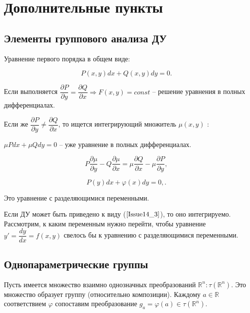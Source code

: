 
\section{Дополнительные пункты}

\subsection{Элементы группового анализа ДУ}

Уравнение первого порядка в общем виде:

\begin{equation}
	P(x,y)dx + Q(x,y)dy = 0.
	\label{Issue14_1}
\end{equation}

Если выполняется $\dfrac{\partial P}{\partial y} = \dfrac{\partial Q}{\partial x} \Rightarrow F(x,y) = const$ -- решение уравнения в полных дифференциалах.

Если же $\dfrac{\partial P}{\partial y} \neq \dfrac{\partial Q}{\partial x}$, то ищется интегрирующий множитель $\mu(x,y)$ :

$\mu Pdx + \mu Qdy = 0$ -- уже уравнение в полных дифференциалах.

\begin{equation}
	P\frac{\partial \mu}{\partial y} - Q \frac{\partial \mu}{\partial x} = \mu \dfrac{\partial Q}{\partial x} - \mu \dfrac{\partial P}{\partial y},
	\label{Issue14_2}
\end{equation}

\begin{equation}
	P(y)dx + \varphi(x)dy = 0,
	\label{Issue14_3}.
\end{equation}

Это уравнение с разделяющимися переменными.

Если ДУ может быть приведено к виду ($\ref{Issue14_3}$), то оно интегрируемо. Рассмотрим, к каким переменным нужно перейти, чтобы уравнение $y' = \dfrac{dy}{dx} = f(x,y)$ свелось бы к уравнению с разделяющимися переменными.

\subsection{Однопараметрические группы}

Пусть имеется множество взаимно однозначных преобразований $\mathbb{R}^n: \tau(\mathbb{R}^n)$.
Это множество образует группу (относительно композиции). Каждому $a \in \mathbb{R}$ соответствием $\varphi$ сопоставим преобразование $g_a = \varphi(a) \in \tau(\mathbb{R}^n)$.

